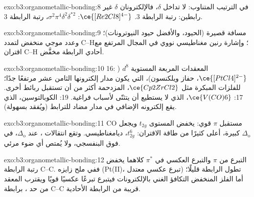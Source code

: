 \begin{solution}{exo:b3:organometallic-bonding:8}
في الترتيب المتناوب: لا تداخل $\delta$، فالإلكترونان $\delta$ غير رابطين: رتبة الرابطة 3. $\ce{[Re2Cl8]^{4-}}$:
$\sigma^2\pi^4\delta^2\delta^{\ast2}$، رتبة الرابطة 3.
\end{solution}

\begin{solution}{exo:b3:organometallic-bonding:9}
مسافة  قصيرة (الحيود، والأفضل حيود النيوترونات)؛ وعدد موجي منخفض لتمدد C--H؛
وإشارة رنين مغناطيسي نووي في المجال المرتفع مع اقتران C--H أحادي الرابطة مخفَّض.
\end{solution}

\begin{solution}{exo:b3:organometallic-bonding:10}
16: المعقدات المربعة المستوية $d^8$ ($\ce{[PtCl4]^{2-}}$، حفاز ويلكنسون)، التي يكون مدار إلكترونها الثامن عشر
مرتفعًا جدًا؛  للفلزات المبكرة مثل $\ce{Cp2ZrCl2}$، المزدحمة أكثر من أن تستقبل
ربائط أخرى. 17: $\ce{V(CO)6}$، الذي لا يستطيع أن يتثنّى لأسباب فراغية. 19: الكوبالتوسين،
الذي يقع إلكترونه الإضافي في مدار مضاد للترابط (ويُفقد بسهولة).
\end{solution}

\begin{solution}{exo:b3:organometallic-bonding:11}
CO مستقبل $\pi$ قوي: يخفض المستوى $t_{2g}$ ويجعل $\Delta_{\mathrm o}$ كبيرة، أعلى كثيرًا من
طاقة الاقتران: $t_{2g}^6$، ديامغناطيسي. وتقع انتقالات ، عند $\Delta_{\mathrm o}$، في فوق البنفسجي،
ولا يُمتص أي ضوء مرئي.
\end{solution}

\begin{solution}{exo:b3:organometallic-bonding:12}
التبرع من $\pi$ والتبرع العكسي في $\pi^*$ كلاهما يخفض رتبة الرابطة C--C. ففي ملح
زايزه (Pt(II)، تبرع عكسي معتدل) تطول الرابطة قليلًا؛ أما الفلز المنخفض التكافؤ
الغني بالإلكترونات فيتبرع تبرعًا عكسيًا قويًا ويقترب المعقد من حد
، برابطة C--C قريبة من الرابطة الأحادية.
\end{solution}

